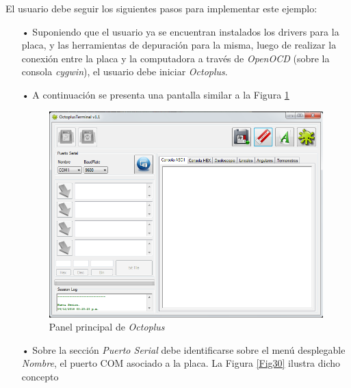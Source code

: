 \documentclass[12pt,letterpaper]{article}
\begin{document}
El usuario debe seguir los siguientes pasos para implementar este ejemplo:
\begin{enumerate}
\item[•]Suponiendo que el usuario ya se encuentran instalados los drivers para la placa, y las herramientas de depuración para la misma, luego de realizar la conexión entre la placa y la computadora a través de \textit{OpenOCD} (sobre la consola \textit{cygwin}), el usuario debe iniciar \textit{Octoplus}.
\item[•]A continuación se presenta una pantalla similar a la Figura \ref{Fig29}


\begin{figure}[H]
\centering
\includegraphics[width=6 cm]{figuras/f11.png}
\caption{Panel principal de \textit{Octoplus}}
\label{Fig29}
\end{figure}


\item[•]Sobre la sección \textit{Puerto Serial} debe identificarse sobre el menú desplegable \textit{Nombre}, el puerto COM asociado a la placa. La Figura \ref{Fig30} ilustra dicho concepto


\end{enumerate}
\end{document}

